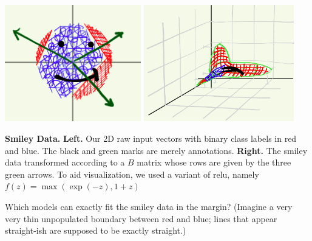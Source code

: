 \documentclass[11pt, justified]{tufte-book}
\theoremstyle{definition}
\begin{document}

        \pagebreak
        \begin{marginfigure}%
          \centering
          \includegraphics[width=0.4445\textwidth]{smiley}%
          \includegraphics[width=0.49\textwidth]{smiley-transformed}%
            \caption{\textbf{Smiley Data.} \textbf{Left.} Our 2D raw input
            vectors with binary class labels in red and blue.  The black and
            green marks are merely annotations.  \textbf{Right.} The smiley
            data transformed according to a $B$ matrix whose rows are given by
            the three green arrows.  To aid visualization, we used a variant
            of relu, namely $f(z) = \max(\exp(-z),1+z)$}
        \end{marginfigure}
        Which models can exactly fit the smiley data in the margin?  (Imagine a
        very very thin unpopulated boundary between red and blue; lines that
        appear straight-ish are supposed to be exactly straight.) 
\end{document}
